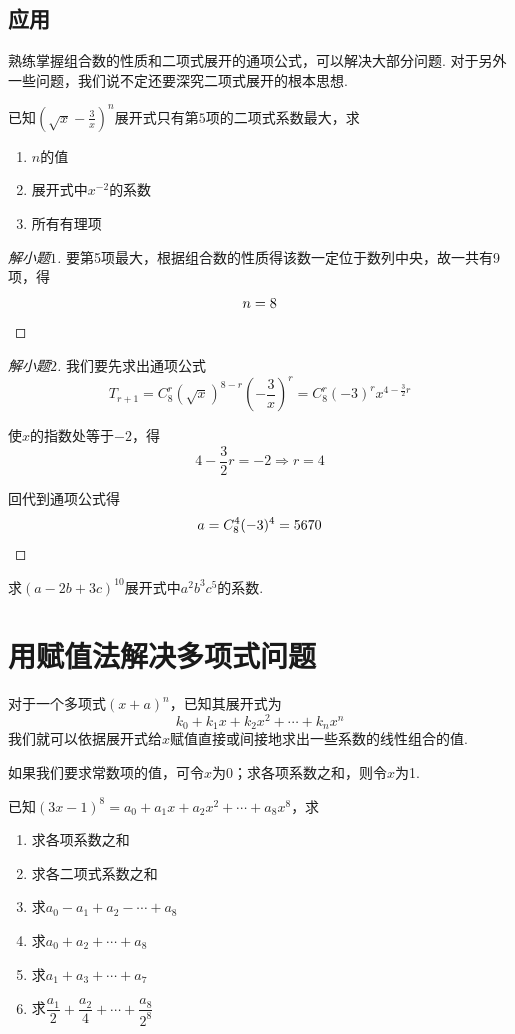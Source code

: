 \subsection{应用}
熟练掌握组合数的性质和二项式展开的通项公式，可以解决大部分问题. 对于另外一些问题，我们说不定还要深究二项式展开的根本思想.

\begin{example}
	已知$(\sqrt{x}-\frac{3}{x})^n$展开式只有第$5$项的二项式系数最大，求

	\begin{enumerate}
		\item $n$的值
		\item 展开式中$x^{-2}$的系数
		\item 所有有理项
	\end{enumerate}
\end{example}

\begin{proof}[解小题$1$]
	要第5项最大，根据组合数的性质得该数一定位于数列中央，故一共有9项，得\[n=8\qedhere\]
\end{proof}

\begin{proof}[解小题$2$]
	我们要先求出通项公式\[T_{r+1}=C_8^r(\sqrt{x})^{8-r}(-\frac{3}{x})^r=C_8^r(-3)^rx^{4-\frac{3}{2}r}\]

	使$x$的指数处等于$-2$，得\[4-\frac{3}{2}r=-2\Rightarrow r=4\]

	回代到通项公式得\[a=C_8^4(-3)^4=5670\qedhere\]
\end{proof}

\begin{example}
	求$(a-2b+3c)^{10}$展开式中$a^2b^3c^5$的系数.
\end{example}

\section[多项式问题]{用赋值法解决多项式问题}
对于一个多项式$(x+a)^n$，已知其展开式为\[k_0+k_1x+k_2x^2+\cdots+k_nx^n\]我们就可以依据展开式给$x$赋值直接或间接地求出一些系数的线性组合的值.

如果我们要求常数项的值，可令$x$为0；求各项系数之和，则令$x$为1.

\begin{example}
	已知$(3x-1)^8=a_0+a_1x+a_2x^2+\cdots+a_8x^8$，求

	\begin{enumerate}
		\item 求各项系数之和
		\item 求各二项式系数之和
		\item 求$a_0-a_1+a_2-\cdots+a_8$
		\item 求$a_0+a_2+\cdots+a_8$
		\item 求$a_1+a_3+\cdots+a_7$
		\item 求$\dfrac{a_1}{2}+\dfrac{a_2}{4}+\cdots+\dfrac{a_8}{2^8}$
	\end{enumerate}
\end{example}
